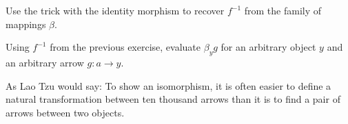 \documentclass[DaoFP]{subfiles}
\begin{document}
\begin{exercise}
Use the trick with the identity morphism to recover $f^{-1}$ from the family of mappings $\beta$.
\end{exercise}
\begin{exercise}
Using $f^{-1}$ from the previous exercise, evaluate $\beta_y g$ for an arbitrary object $y$ and an arbitrary arrow $g \colon a \to y$.
\end{exercise}


As Lao Tzu would say: To show an isomorphism, it is often easier to define a natural transformation between ten thousand arrows than it is to find a pair of arrows between two objects.
\end{document}
